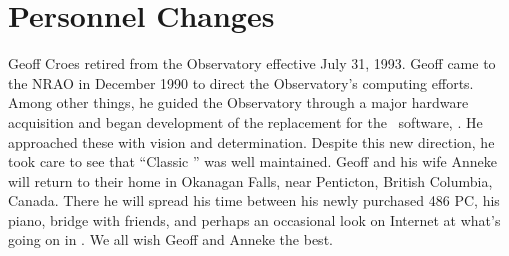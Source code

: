 

\newcommand{\AIPRELEASE}{July 15, 1993}
\newcommand{\AIPVOLUME}{Volume XIII}
\newcommand{\AIPNUMBER}{Number 1}
\newcommand{\RELEASENAME}{{\tt 15JUL93}}




\newcommand{\MYSpace}{-11pt}

\normalstyle
\section{Personnel Changes}
\vskip -8pt

Geoff Croes retired from the Observatory effective July 31, 1993.
Geoff came to the NRAO in December 1990 to direct the Observatory's
computing efforts.   Among other things, he guided the Observatory
through a major hardware acquisition and began development of the
replacement for the \AIPS\ software, \hbox{{\AIPTOO}}.  He approached
these with vision and determination.  Despite this new direction, he
took care to see that ``Classic \AIPS'' was well maintained.
Geoff and his wife Anneke will return to their home in Okanagan Falls,
near Penticton, British Columbia, Canada.  There he will spread his
time between his newly purchased 486 PC, his piano, bridge with
friends, and perhaps an occasional look on Internet at what's going on
in \hbox{{\AIPTOO}}.  We all wish Geoff and Anneke the best.

